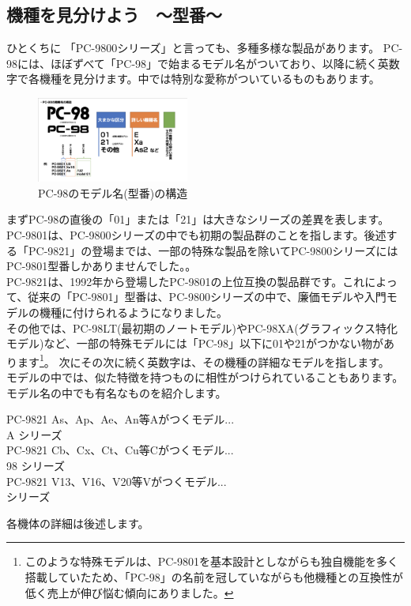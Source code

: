 \documentclass[b5paper,9pt,platex,dvipdfmx]{jsarticle}
\begin{document}
\begin{multicols*}{3}
\section[short]{機種を見分けよう　〜型番〜}
ひとくちに 「PC-9800シリーズ」と言っても、多種多様な製品があります。
PC-98には、ほぼずべて「PC-98」で始まるモデル名がついており、以降に続く英数字で各機種を見分けます。中では特別な愛称がついているものもあります。
\begin{figure}[H]
  \centering
  \includegraphics[width=5cm]{img-2.png}
  \caption{PC-98のモデル名(型番)の構造}
\end{figure}
まずPC-98の直後の「01」または「21」は大きなシリーズの差異を表します。\\
PC-9801は、PC-9800シリーズの中でも初期の製品群のことを指します。後述する「PC-9821」の登場までは、一部の特殊な製品を除いてPC-9800シリーズにはPC-9801型番しかありませんでした。。\\
PC-9821は、1992年から登場したPC-9801の上位互換の製品群です。これによって、従来の「PC-9801」型番は、PC-9800シリーズの中で、廉価モデルや入門モデルの機種に付けられるようになりました。\\
その他では、PC-98LT(最初期のノートモデル)やPC-98XA(グラフィックス特化モデル)など、一部の特殊モデルには「PC-98」以下に01や21がつかない物があります\footnote{このような特殊モデルは、PC-9801を基本設計としながらも独自機能を多く搭載していたため、「PC-98」の名前を冠していながらも他機種との互換性が低く売上が伸び悩む傾向にありました。}。
次にその次に続く英数字は、その機種の詳細なモデルを指します。\\
モデルの中では、似た特徴を持つものに相性がつけられていることもあります。\\
モデル名の中でも有名なものを紹介します。\\
\begin{screen}
  PC-9821 As、Ap、Ae、An等Aがつくモデル...\\
   A シリーズ\\
  PC-9821 Cb、Cx、Ct、Cu等Cがつくモデル...\\
  98  シリーズ\\
  PC-9821 V13、V16、V20等Vがつくモデル...\\
   シリーズ
  \end{screen}
  各機体の詳細は後述します。

\end{multicols*}
\end{document}
